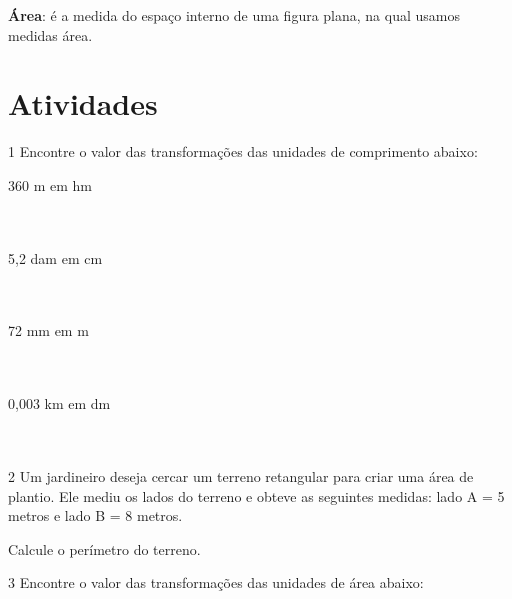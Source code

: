 \textbf{Área}: é a medida do espaço interno de uma figura plana,
na qual usamos medidas área.


\section{Atividades}

\num{1} Encontre o valor das transformações das unidades de comprimento
abaixo:

\begin{escolha}

\item 360 m em hm \\ 
 \\ \\

\item 5,2 dam em cm \\ 
 \\ \\

\item 72 mm em m \\ 
 \\ \\

\item 0,003 km em dm \\ 
 \\ \\

\end{escolha}

\num{2} Um jardineiro deseja cercar um terreno retangular para criar uma área
de plantio. Ele mediu os lados do terreno e obteve as seguintes medidas:
lado A = 5 metros e lado B = 8 metros.

Calcule o perímetro do terreno.


\num{3} Encontre o valor das transformações das unidades de área abaixo:

